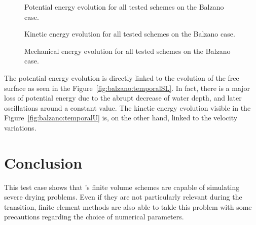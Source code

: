 \begin{figure}[H]
  \centering
  \caption{Potential energy evolution for all tested schemes on the Balzano case.}
\label{fig:balzano:Ep}
\end{figure}

\begin{figure}[H]
  \centering
  \caption{Kinetic energy evolution for all tested schemes on the Balzano case.}
\label{fig:balzano:Ec}
\end{figure}

\begin{figure}[H]
  \centering
  \caption{Mechanical energy evolution for all tested schemes on the Balzano case.}
\label{fig:balzano:Em}
\end{figure}

The potential energy evolution is directly linked to the evolution of the free surface as
seen in the Figure~\ref{fig:balzano:temporalSL}. In fact, there is a major loss of
potential energy due to the abrupt decrease of water depth, and later oscillations around a constant value.
The kinetic energy evolution visible in the Figure~\ref{fig:balzano:temporalU} is,
on the other hand, linked to the velocity variations.



%
\section{Conclusion}

This test case shows that 's finite volume schemes are capable of simulating severe drying problems.
Even if they are not particularly relevant during the transition,
finite element methods are also able to takle this 
problem with some precautions regarding the choice of numerical parameters.



